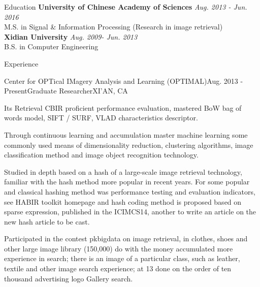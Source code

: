 \documentclass{resume} %
\begin{document}

\begin{rSection}{Education}
{\bf University of Chinese Academy of Sciences} \hfill {\em Aug. 2013 - Jun. 2016} \\
M.S. in  Signal \& Information Processing (Research in image retrieval) \\
{\bf Xidian University} \hfill {\em Aug. 2009- Jun. 2013} \\
B.S. in Computer Engineering \\
\end{rSection}


\begin{rSection}{Experience}

\begin{rSubsection}{Center for OPTical IMagery Analysis and Learning (OPTIMAL)}{Aug. 2013 - Present}{Graduate Researcher}{XI'AN, CA}
\item Its Retrieval CBIR proficient performance evaluation, mastered BoW bag of words model, SIFT / SURF, VLAD characteristics descriptor.
\item Through continuous learning and accumulation master machine learning some commonly used means of dimensionality reduction, clustering algorithms, image classification method and image object recognition technology.
\item Studied in depth based on a hash of a large-scale image retrieval technology, familiar with the hash method more popular in recent years. For some popular and classical hashing method was performance testing and evaluation indicators, see HABIR toolkit homepage and hash coding method is proposed based on sparse expression, published in the ICIMCS14, another to write an article on the new hash article to be cast.
\item Participated in the contest pkbigdata on image retrieval, in clothes, shoes and other large image library (150,000) do with the money accumulated more experience in search; there is an image of a particular class, such as leather, textile and other image search experience; at 13 done on the order of ten thousand advertising logo Gallery search.
\end{rSubsection}

\end{rSection}
\end{document}
